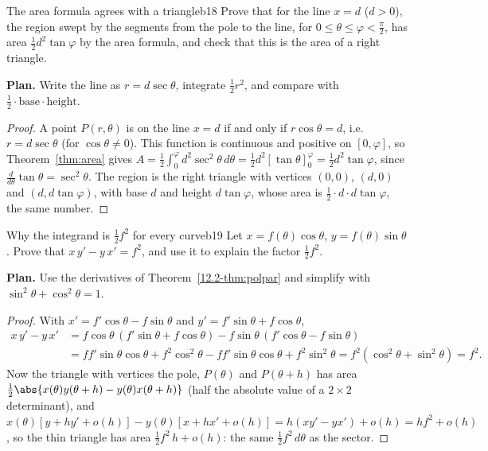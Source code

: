 \documentclass[11pt]{article}
\begin{document}
\begin{exmp}{The area formula agrees with a triangle}{b18}
Prove that for the line $x=d$ ($d>0$), the region swept by the segments from the pole to the line, for $0\le\theta\le\varphi<\frac\pi2$, has area $\frac12d^2\tan\varphi$ by the area formula, and check that this is the area of a right triangle.

\textbf{Plan.} Write the line as $r=d\sec\theta$, integrate $\frac12r^2$, and compare with $\frac12\cdot\text{base}\cdot\text{height}$.

\begin{proof}
A point $P(r,\theta)$ is on the line $x=d$ if and only if $r\cos\theta=d$, i.e. $r=d\sec\theta$ (for $\cos\theta\ne0$). This function is continuous and positive on $[0,\varphi]$, so Theorem~\ref{thm:area} gives $A=\frac12\int_0^\varphi d^2\sec^2\theta\,d\theta=\frac12d^2\left[\tan\theta\right]_0^\varphi=\frac12d^2\tan\varphi$, since $\frac d{d\theta}\tan\theta=\sec^2\theta$. The region is the right triangle with vertices $(0,0)$, $(d,0)$ and $(d,d\tan\varphi)$, with base $d$ and height $d\tan\varphi$, whose area is $\frac12\cdot d\cdot d\tan\varphi$, the same number.
\end{proof}
\end{exmp}

\begin{exmp}{Why the integrand is $\frac12f^2$ for every curve}{b19}
Let $x=f(\theta)\cos\theta$, $y=f(\theta)\sin\theta$. Prove that $x\,y'-y\,x'=f^2$, and use it to explain the factor $\frac12f^2$.

\textbf{Plan.} Use the derivatives of Theorem~\ref{12.2-thm:polpar} and simplify with $\sin^2\theta+\cos^2\theta=1$.

\begin{proof}
With $x'=f'\cos\theta-f\sin\theta$ and $y'=f'\sin\theta+f\cos\theta$,
\begin{align*}
x\,y'-y\,x'&=f\cos\theta\,\left(f'\sin\theta+f\cos\theta\right)-f\sin\theta\,\left(f'\cos\theta-f\sin\theta\right)\\
&=ff'\sin\theta\cos\theta+f^2\cos^2\theta-ff'\sin\theta\cos\theta+f^2\sin^2\theta=f^2\left(\cos^2\theta+\sin^2\theta\right)=f^2.
\end{align*}
Now the triangle with vertices the pole, $P(\theta)$ and $P(\theta+h)$ has area $\frac12\abs{x(\theta)y(\theta+h)-y(\theta)x(\theta+h)}$ (half the absolute value of a $2\times2$ determinant), and $x(\theta)\left[y+hy'+o(h)\right]-y(\theta)\left[x+hx'+o(h)\right]=h\left(xy'-yx'\right)+o(h)=hf^2+o(h)$, so the thin triangle has area $\frac12f^2\,h+o(h)$: the same $\frac12f^2\,d\theta$ as the sector.
\end{proof}
\end{exmp}
\end{document}
